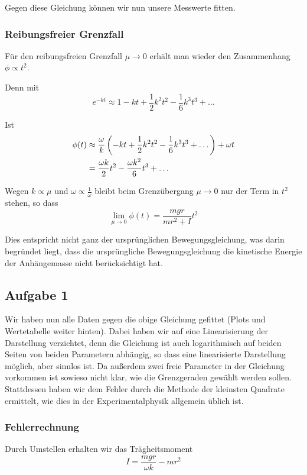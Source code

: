 \documentclass[a4paper,german,12pt,smallheadings]{scrartcl}
\begin{document}
Gegen diese Gleichung können wir nun unsere Messwerte fitten.

\subsubsection{Reibungsfreier Grenzfall}
Für den reibungsfreien Grenzfall $\mu \to
0$ erhält man wieder den Zusammenhang $\phi \propto t^2$.

Denn mit
\begin{equation}
  e^{-kt} \approx 1 - kt + \frac{1}{2} k^2 t^2 - \frac{1}{6} k^3t^3 + \dots
\end{equation}

Ist
\begin{align}
  \phi(t) &\approx \frac{\omega}{k}\del{-kt + \frac{1}{2}k^2t^2 - \frac{1}{6} k^3t^3 + \dots} + \omega t\\
          &= \frac{\omega k}{2} t^2 -  \frac{\omega k^2}{6} t^3 + \dots
\end{align}

Wegen $k \propto \mu$ und $\omega \propto \frac{1}{\omega}$ bleibt beim Grenzübergang $\mu \to 0$ nur der Term in $t^2$ stehen, so dass
\begin{equation}
  \lim_{\mu \to 0} \phi(t) = \frac{mgr}{mr^2 +I} t^2
\end{equation}

Dies entspricht nicht ganz der ursprünglichen Bewegungsgleichung, was darin
begründet liegt, dass die ursprüngliche Bewegungsgleichung die kinetische
Energie der Anhängemasse nicht berücksichtigt hat.

\subsection{Aufgabe 1}
Wir haben nun alle Daten gegen die obige Gleichung gefittet (Plots und
Wertetabelle weiter hinten). Dabei haben wir auf eine Linearisierung der
Darstellung verzichtet, denn die Gleichung ist auch logarithmisch auf beiden
Seiten von beiden Parametern abhängig, so dass eine linearisierte Darstellung
möglich, aber sinnlos ist. Da außerdem zwei freie Parameter in der Gleichung
vorkommen ist sowieso nicht klar, wie die Grenzgeraden gewählt werden sollen.
Stattdessen haben wir dem Fehler durch die Methode der kleinsten Quadrate
ermittelt, wie dies in der Experimentalphysik allgemein üblich ist.

\subsubsection{Fehlerrechnung}
Durch Umstellen erhalten wir das Trägheitsmoment
\begin{equation}
  I = \frac{mgr}{\omega k} - mr^2
\end{equation}
\end{document}
